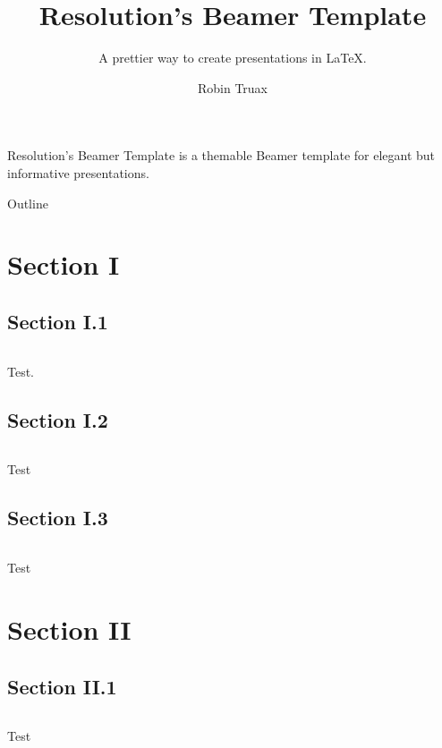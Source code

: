 \documentclass[notheorems, compress]{beamer}
\title{Resolution's Beamer Template}
\subtitle{A prettier way to create presentations in \LaTeX. \subtitleline}
\author{Robin Truax}
\begin{document}
\begin{frame}[plain]
    \titlepage
\end{frame}

\begin{frame}[plain]
    Resolution's Beamer Template is a themable Beamer template for elegant but informative presentations.
\end{frame}

\begin{frame}{Outline}
    \tableofcontents
\end{frame}

\section{Section I}

\subsection{Section I.1}
\begin{frame}{$ $}
     \begin{definition}[Test]\label{def:Test}
         Test.
     \end{definition}
\end{frame}

\subsection{Section I.2}
\begin{frame}{$ $}
     \begin{conjecture}[Test]\label{conj:Test}
         Test
     \end{conjecture}
\end{frame}

\subsection{Section I.3}
\begin{frame}{$ $}
    \begin{example}[Test]\label{exam:Test}
        Test
    \end{example}
\end{frame}

\section{Section II}

\subsection{Section II.1}
\begin{frame}{$ $}
    \begin{problem}[Test]\label{prob:Test}
        Test
    \end{problem}
\end{frame}
\end{document}
